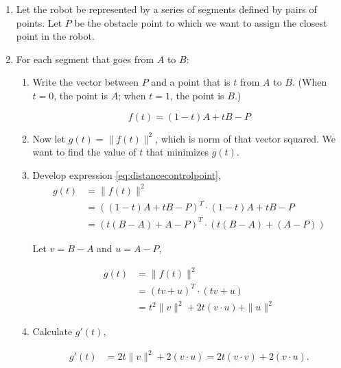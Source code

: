 \begin{enumerate}
    \item Let the robot be represented by a series of segments defined by pairs of points. Let $P$ be the obstacle point to which we want to assign the closest point in the robot.

    \item For each segment that goes from $A$ to $B$:

    \begin{enumerate}
        \item Write the vector between $P$ and a point that is $t$ from $A$ to $B$. (When $t = 0$, the point is $A$; when $t = 1$, the point is $B$.)


        \begin{equation}
            \label{eq:distancecontrolpoint}
            f(t) = (1-t)A + t B  - P
        \end{equation}

        \item Now let $g(t) = \| f(t) \|^2$, which is norm of that vector squared. We want to find the value of $t$ that minimizes $g(t)$.
        \item Develop expression \ref{eq:distancecontrolpoint},
        \begin{equation*}
            \begin{split}
            g(t) & = \|f(t)\|^2 \\
            &= ((1-t)A + t B  - P)^T \cdot (1-t)A + t B  - P \\
            &= (t (B-A) + A-P)^T \cdot (t (B-A) + (A-P))
            \end{split}
        \end{equation*}

        Let $v = B-A$ and $u = A - P$,


        \begin{equation*}
            \begin{split}
            g(t) & = \|f(t)\|^2 \\
            &= (t v + u)^T \cdot (t v + u)\\
            &= t^2 \|v\|^2  + 2t (v \cdot u) + \|u\|^2
            \end{split}
        \end{equation*}

        \item Calculate $g'(t)$,

        \begin{align}
        g'(t) & = 2t \|v\|^2  + 2 (v \cdot u) = 2t (v \cdot v)  + 2 (v \cdot u).
        \end{align}


\end{enumerate}
\end{enumerate}
